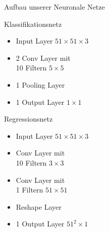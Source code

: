 \begin{frame}{Aufbau unserer Neuronale Netze}
	\centering
\begin{minipage}{0.49\textwidth}
\centering
Klassifikationsnetz

\begin{itemize}
\item Input Layer $51 \times 51 \times 3$
\item 2 Conv Layer mit \\ 10 Filtern $5 \times 5$
\item 1 Pooling Layer
\item 1 Output Layer $1 \times 1$
\vspace{2.5em}
\end{itemize}
\end{minipage}
\begin{minipage}{0.49\textwidth}
\centering
Regressionsnetz

\begin{itemize}
\item Input Layer $51 \times 51 \times 3$
\item Conv Layer mit \\ 10 Filtern $3 \times 3$
\item Conv Layer mit \\ 1 Filtern  $51 \times 51$
\item Reshape Layer
\item 1 Output Layer $51^2 \times 1$
\end{itemize}

\end{minipage}

\end{frame}